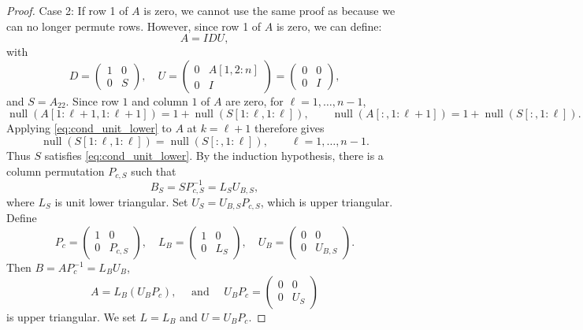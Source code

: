 \documentclass[10pt,twoside]{siamart1116}
\DeclareMathOperator{\nl}{null}
\numberwithin{theorem}{section}
\begin{document}
\begin{proof}
  Case 2: If row 1 of $A$ is zero, we cannot use the same proof as  because we can no longer permute rows. However, since row 1 of $A$ is zero, we can define:
  \[
    A = IDU,
  \]
  with
  \[
    D =
    \begin{pmatrix}
      1 & 0 \\
      0 & S
    \end{pmatrix}, \quad
    U =
    \begin{pmatrix}
      0 & A[1,2:n] \\
      0 & I
    \end{pmatrix} =
    \begin{pmatrix}
      0 & 0 \\
      0 & I
    \end{pmatrix},
  \]
  and $S=A_{22}$. Since row $1$ and column $1$ of $A$ are zero, for $\ell=1,\ldots,n-1$,
  \[
    \nl(A[1:\ell+1,1:\ell+1])
    =
    1+\nl(S[1:\ell,1:\ell]),
    \qquad
    \nl(A[:,1:\ell+1])
    =
    1+\nl(S[:,1:\ell]).
  \]
  Applying \cref{eq:cond_unit_lower} to $A$ at $k=\ell+1$ therefore gives
  \[
    \nl(S[1:\ell,1:\ell]) = \nl(S[:,1:\ell]),
    \qquad \ell=1,\ldots,n-1.
  \]
  Thus $S$ satisfies \cref{eq:cond_unit_lower}. By the induction hypothesis, there is a column permutation $P_{c,S}$ such that
  \[
    B_S = S P_{c,S}^{-1} = L_S U_{B,S},
  \]
  where $L_S$ is unit lower triangular. Set $U_S = U_{B,S}P_{c,S}$, which is upper triangular. Define
  \[
    P_c =
    \begin{pmatrix}
      1 & 0       \\
      0 & P_{c,S}
    \end{pmatrix}, \quad
    L_B =
    \begin{pmatrix}
      1 & 0   \\
      0 & L_S
    \end{pmatrix}, \quad
    U_B =
    \begin{pmatrix}
      0 & 0       \\
      0 & U_{B,S}
    \end{pmatrix}.
  \]
  Then $B = A P_c^{-1}=L_B U_B$,
  \[
    A = L_B(U_B P_c), \quad \text{ and } \quad
    U_B P_c =
    \begin{pmatrix}
      0 & 0   \\
      0 & U_S
    \end{pmatrix}
  \]
  is upper triangular. We set $L=L_B$ and $U=U_B P_c$.


\end{proof}
\end{document}
